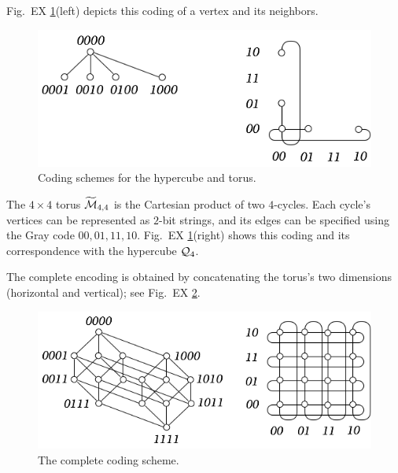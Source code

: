 \begin{itemize}
Fig.~EX \ref{fig:IsomorphismCodingPrinciple}(left) depicts this coding of a vertex and its neighbors.
 \begin{figure}[hbt]
\begin{center}
       \includegraphics[scale=0.4]{FiguresGraph/IsomorphismEx2}
       \caption{Coding schemes for the hypercube and torus.}
  \label{fig:IsomorphismCodingPrinciple}
\end{center}
\end{figure}

\smallskip

The $4 \times 4$ torus $\widetilde{\mbox{$\cal M$}}_{4,4}$ is the Cartesian product of two $4$-cycles.  Each cycle's vertices can be represented as $2$-bit strings, and its edges can be specified using the Gray code $00, 01, 11, 10$.  Fig.~EX \ref{fig:IsomorphismCodingPrinciple}(right) shows this coding and its correspondence with the hypercube $\mbox{$\cal Q$}_4$. 

The complete encoding is obtained by concatenating the torus's two dimensions (horizontal and vertical); see Fig.~EX \ref{fig:IsomorphismCodingComplete}.
\begin{figure}[hbt]
\begin{center}
       \includegraphics[scale=0.4]{FiguresGraph/IsomorphismEx1}
       \caption{The complete coding scheme.}
  \label{fig:IsomorphismCodingComplete}
\end{center}
\end{figure}


\end{itemize}
